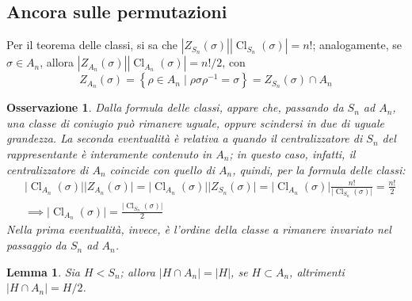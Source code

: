 \documentclass[12pt]{scrartcl}
\theoremstyle{style}
\newtheorem{lemma}{Lemma}[teorema]
\newtheorem{osservazione}{Osservazione}[section]
\numberwithin{equation}{subsection}
\begin{document}
\subsection{Ancora sulle permutazioni}
Per il teorema delle classi, si sa che $|Z_{S_n} (\sigma )| |\operatorname{Cl}_{S_n}  (\sigma )| = n!$; analogamente, se $\sigma  \in A_n$, allora $|Z_{A_n} (\sigma )| |\operatorname{Cl} _{A_n} (\sigma )| = n! / 2$, con
\[
Z_{A_n} (\sigma ) = \left\{ \rho \in A_n  \mid \rho \sigma \rho ^{-1}= \sigma  \right\} = Z_{S_n} (\sigma ) \cap A_n
\] 
\begin{osservazione}
Dalla formula delle classi, appare che, passando da $S_n$ ad $A_n$, una classe di coniugio pu\`o rimanere uguale, oppure scindersi in due di uguale grandezza.
La seconda eventualit\`a \`e relativa a quando il centralizzatore di $S_n$ del rappresentante \`e interamente contenuto in $A_n$; in questo caso, infatti, il centralizzatore di $A_n$ coincide con quello di $A_n$, quindi, per la formula delle classi:
\[
	\begin{split}
		&\lvert \operatorname{Cl} _{A_n} (\sigma ) \rvert \lvert Z_{A_n} (\sigma ) \rvert =\lvert \operatorname{Cl} _{A_n} (\sigma ) \rvert \lvert Z_{S_n} (\sigma ) \rvert  =\lvert \operatorname{Cl} _{A_n} (\sigma ) \rvert \frac{n!}{\lvert \operatorname{Cl} _{S_n} (\sigma ) \rvert}  =\frac{n!}{2} \\
		&\implies \lvert \operatorname{Cl} _{A_n} (\sigma ) \rvert=\frac{\lvert \operatorname{Cl} _{S_n} (\sigma ) \rvert}{2}
	\end{split}
\] 
Nella prima eventualit\`a, invece, \`e l'ordine della classe a rimanere invariato nel passaggio da $S_n$ ad $A_n$.
\end{osservazione}
\begin{lemma}
	Sia $H < S_n$; allora $ \lvert H \cap  A_n \rvert = |H|$, se $H \subset A_n$, altrimenti $\lvert H \cap A_n \rvert = H / 2$.
\end{lemma}
\end{document}
